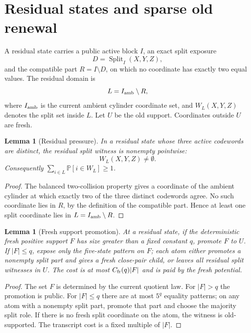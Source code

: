 \documentclass[11pt]{article}
\newtheorem{lemma}[theorem]{Lemma}
\theoremstyle{remark}
\newcommand{\Prob}{\mathbb P}
\newcommand{\Split}{\operatorname{Split}}
\begin{document}
\section{Residual states and sparse old renewal}\label{sec:residual}

A residual state carries a public active block $I$, an exact split exposure
\[
        D=\Split_I(X,Y,Z),
\]
and the compatible part $R=I\setminus D$, on which no coordinate has exactly two equal values.  The residual domain is
\[
        L=I_{\rm amb}\setminus R,
\]
where $I_{\rm amb}$ is the current ambient cylinder coordinate set, and $W_L(X,Y,Z)$ denotes the split set inside $L$.  Let $U$ be the old support.  Coordinates outside $U$ are fresh.

\begin{lemma}[Residual pressure]\label{lem:residual-pressure}
In a residual state whose three active codewords are distinct, the residual split witness is nonempty pointwise:
\[
        W_L(X,Y,Z)\ne\emptyset .
\]
Consequently $\sum_{i\in L}\Prob[i\in W_L]\ge1$.
\end{lemma}

\begin{proof}
The balanced two-collision property gives a coordinate of the ambient cylinder at which exactly two of the three distinct codewords agree.  No such coordinate lies in $R$, by the definition of the compatible part.  Hence at least one split coordinate lies in $L=I_{\rm amb}\setminus R$.
\end{proof}

\begin{lemma}[Fresh support promotion]\label{lem:fresh-promotion}
At a residual state, if the deterministic fresh positive support $F$ has size greater than a fixed constant $q$, promote $F$ to $U$.  If $|F|\le q$, expose only the five-state pattern on $F$; each atom either promotes a nonempty split part and gives a fresh close-pair child, or leaves all residual split witnesses in $U$.  The cost is at most $C_{\rm fr}(q)|F|$ and is paid by the fresh potential.
\end{lemma}

\begin{proof}
The set $F$ is determined by the current quotient law.  For $|F|>q$ the promotion is public.  For $|F|\le q$ there are at most $5^q$ equality patterns; on any atom with a nonempty split part, promote that part and choose the majority split role.  If there is no fresh split coordinate on the atom, the witness is old-supported.  The transcript cost is a fixed multiple of $|F|$.
\end{proof}
\end{document}
